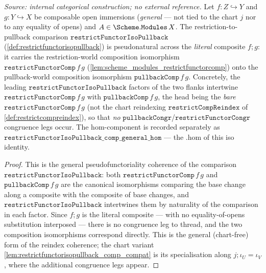 \begin{lemma}\leanok
  \label{lem:restrictfunctorisopullback_comp_general}
  \textit{Source: internal categorical construction; no external reference.}
  Let \(f : Z \hookrightarrow Y\) and \(g : Y \hookrightarrow X\) be composable open immersions
  (\emph{general} --- not tied to the chart \(j\) nor to any equality of opens) and
  \(A \in \Scheme.\mathtt{Modules}\,X\). The restriction-to-pullback comparison
  \(\mathtt{restrictFunctorIsoPullback}\) (\cref{def:restrictfunctorisopullback}) is pseudonatural
  across the \emph{literal} composite \(f \mathbin{;} g\): it carries the restriction-world
  composition isomorphism \(\mathtt{restrictFunctorComp}\,f\,g\)
  (\cref{lem:scheme_modules_restrictfunctorcomp}) onto the pullback-world composition isomorphism
  \(\mathtt{pullbackComp}\,f\,g\). Concretely, the leading
  \(\mathtt{restrictFunctorIsoPullback}\) factors of the two flanks intertwine
  \(\mathtt{restrictFunctorComp}\,f\,g\) with \(\mathtt{pullbackComp}\,f\,g\), the head being the
  \emph{bare} \(\mathtt{restrictFunctorComp}\,f\,g\) (not the chart reindexing
  \(\mathtt{restrictCompReindex}\) of \cref{def:restrictcompreindex}), so that \emph{no}
  \(\mathtt{pullbackCongr}\)/\(\mathtt{restrictFunctorCongr}\) congruence legs occur. The
  \(\mathrm{hom}\)-component is recorded separately as
  \(\mathtt{restrictFunctorIsoPullback\_comp\_general\_hom}\) --- the \(.\mathrm{hom}\) of this iso
  identity.
\end{lemma}
\begin{proof}
  \leanok
  This is the general pseudofunctoriality coherence of the comparison
  \(\mathtt{restrictFunctorIsoPullback}\): both \(\mathtt{restrictFunctorComp}\,f\,g\) and
  \(\mathtt{pullbackComp}\,f\,g\) are the canonical isomorphisms comparing the base change along a
  composite with the composite of base changes, and \(\mathtt{restrictFunctorIsoPullback}\)
  intertwines them by naturality of the comparison in each factor. Since \(f \mathbin{;} g\) is the
  literal composite --- with no equality-of-opens substitution interposed --- there is no congruence
  leg to thread, and the two composition isomorphisms correspond directly. This is the general
  (chart-free) form of the reindex coherence; the chart variant
  \cref{lem:restrictfunctorisopullback_comp_compat} is its specialisation along
  \(j \mathbin{;} \iota_U = \iota_V\), where the additional congruence legs appear.
\end{proof}

